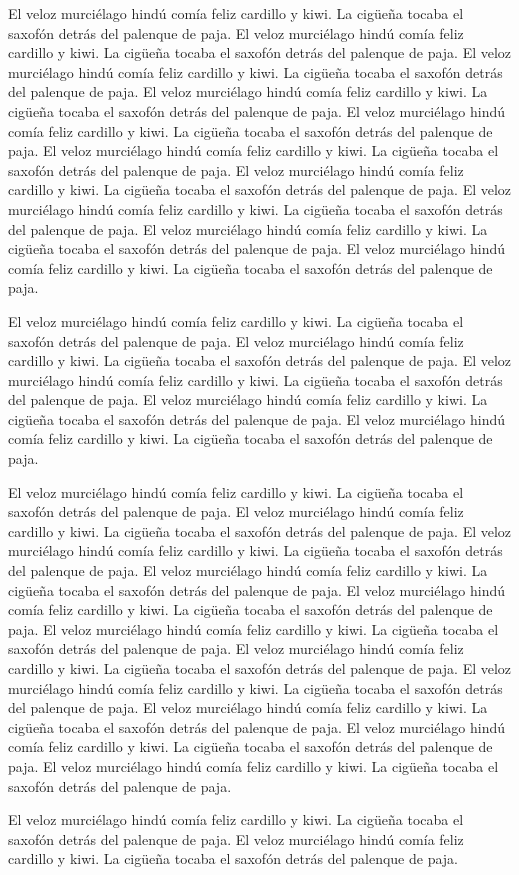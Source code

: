 \documentclass[a4paper,11pt,oneside]{report}
\begin{document}
El veloz murciélago hindú comía feliz cardillo y kiwi. La cigüeña tocaba el
saxofón detrás del palenque de paja.
El veloz murciélago hindú comía feliz cardillo y kiwi. La cigüeña tocaba el
saxofón detrás del palenque de paja.
El veloz murciélago hindú comía feliz cardillo y kiwi. La cigüeña tocaba el
saxofón detrás del palenque de paja.
El veloz murciélago hindú comía feliz cardillo y kiwi. La cigüeña tocaba el
saxofón detrás del palenque de paja.
El veloz murciélago hindú comía feliz cardillo y kiwi. La cigüeña tocaba el
saxofón detrás del palenque de paja.
El veloz murciélago hindú comía feliz cardillo y kiwi. La cigüeña tocaba el
saxofón detrás del palenque de paja.
El veloz murciélago hindú comía feliz cardillo y kiwi. La cigüeña tocaba el
saxofón detrás del palenque de paja.
El veloz murciélago hindú comía feliz cardillo y kiwi. La cigüeña tocaba el
saxofón detrás del palenque de paja.
El veloz murciélago hindú comía feliz cardillo y kiwi. La cigüeña tocaba el
saxofón detrás del palenque de paja.
El veloz murciélago hindú comía feliz cardillo y kiwi. La cigüeña tocaba el
saxofón detrás del palenque de paja.

El veloz murciélago hindú comía feliz cardillo y kiwi. La cigüeña tocaba el
saxofón detrás del palenque de paja.
El veloz murciélago hindú comía feliz cardillo y kiwi. La cigüeña tocaba el
saxofón detrás del palenque de paja.
El veloz murciélago hindú comía feliz cardillo y kiwi. La cigüeña tocaba el
saxofón detrás del palenque de paja.
El veloz murciélago hindú comía feliz cardillo y kiwi. La cigüeña tocaba el
saxofón detrás del palenque de paja.
El veloz murciélago hindú comía feliz cardillo y kiwi. La cigüeña tocaba el
saxofón detrás del palenque de paja.

El veloz murciélago hindú comía feliz cardillo y kiwi. La cigüeña tocaba el
saxofón detrás del palenque de paja.
El veloz murciélago hindú comía feliz cardillo y kiwi. La cigüeña tocaba el
saxofón detrás del palenque de paja.
El veloz murciélago hindú comía feliz cardillo y kiwi. La cigüeña tocaba el
saxofón detrás del palenque de paja.
El veloz murciélago hindú comía feliz cardillo y kiwi. La cigüeña tocaba el
saxofón detrás del palenque de paja.
El veloz murciélago hindú comía feliz cardillo y kiwi. La cigüeña tocaba el
saxofón detrás del palenque de paja.
El veloz murciélago hindú comía feliz cardillo y kiwi. La cigüeña tocaba el
saxofón detrás del palenque de paja.
El veloz murciélago hindú comía feliz cardillo y kiwi. La cigüeña tocaba el
saxofón detrás del palenque de paja.
El veloz murciélago hindú comía feliz cardillo y kiwi. La cigüeña tocaba el
saxofón detrás del palenque de paja.
El veloz murciélago hindú comía feliz cardillo y kiwi. La cigüeña tocaba el
saxofón detrás del palenque de paja.
El veloz murciélago hindú comía feliz cardillo y kiwi. La cigüeña tocaba el
saxofón detrás del palenque de paja.
El veloz murciélago hindú comía feliz cardillo y kiwi. La cigüeña tocaba el
saxofón detrás del palenque de paja.

El veloz murciélago hindú comía feliz cardillo y kiwi. La cigüeña tocaba el
saxofón detrás del palenque de paja.
El veloz murciélago hindú comía feliz cardillo y kiwi. La cigüeña tocaba el
saxofón detrás del palenque de paja.
\end{document}

